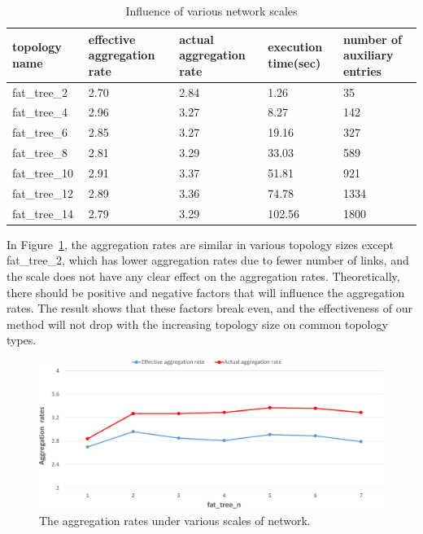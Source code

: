 \documentclass[conference]{IEEEtran}
\begin{document}
\begin{table}[ht]
\centering
\caption{Influence of various network scales}
\begin{tabular}{|p{1.8cm}|p{1.4cm}|p{1.3cm}|p{1.1cm}|p{1.3cm}|}
\hline topology name & effective aggregation rate & actual aggregation rate & execution time(sec) & number of auxiliary entries \\
\hline
\hline fat\_tree\_2 & 2.70 & 2.84 & 1.26 & 35 \\
\hline fat\_tree\_4 & 2.96 & 3.27 & 8.27 & 142 \\
\hline fat\_tree\_6 & 2.85 & 3.27 & 19.16 & 327 \\
\hline fat\_tree\_8 & 2.81 & 3.29 & 33.03 & 589 \\
\hline fat\_tree\_10 & 2.91 & 3.37 & 51.81 & 921 \\
\hline fat\_tree\_12 & 2.89 & 3.36 & 74.78 & 1334 \\
\hline fat\_tree\_14 & 2.79 & 3.29 & 102.56 & 1800 \\
\hline
\end{tabular}
\label{table:different_scale}
\end{table}

In Figure~\ref{different_scale_rate_trend}, the aggregation rates are similar in various topology sizes except fat\_tree\_2, which has lower aggregation rates due to fewer number of links, and the scale does not have any clear effect on the aggregation rates. Theoretically, there should be positive and negative factors that will influence the aggregation rates. The result shows that these factors break even, and the effectiveness of our method will not drop with the increasing topology size on common topology types.

\begin{figure}[ht]
\centering
\includegraphics[width=1\linewidth]{figures/exp_scale_rate_trend.pdf}
\caption{The aggregation rates under various scales of network.}
\label{different_scale_rate_trend}
\end{figure}
\end{document}
